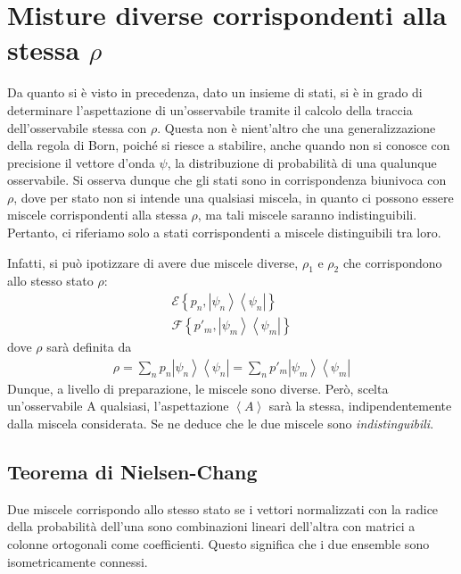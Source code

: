 \section{Misture diverse corrispondenti alla stessa $\rho$}

Da quanto si è visto in precedenza, dato un insieme di stati, si è in grado di determinare l'aspettazione di un'osservabile tramite il calcolo della traccia dell'osservabile stessa con $\rho$. Questa non è nient'altro che una generalizzazione della regola di Born, poiché si riesce a stabilire, anche quando non si conosce con precisione il vettore d'onda $\psi$, la distribuzione di probabilità di una qualunque osservabile. Si osserva dunque che gli stati sono in corrispondenza biunivoca con $\rho$, dove per stato non si intende una qualsiasi miscela, in quanto ci possono essere miscele corrispondenti alla stessa $\rho$, ma tali miscele saranno indistinguibili. Pertanto, ci riferiamo solo a stati corrispondenti a miscele distinguibili tra loro.

Infatti, si può ipotizzare di avere due miscele diverse, $\rho_1$ e $\rho_2$ che corrispondono allo stesso stato $\rho$:
\begin{equation}\begin{split}
\mathcal{E}\left\{p_n,\left|\psi _n \right\rangle\left\langle \psi _n\right |\right\} \\
\mathcal{F}\left\{p'_m,\left |\psi _m \right\rangle\left\langle \psi _m\right |\right\}
\end{split}\end{equation}
dove $\rho$ sarà definita da
\begin{equation}\begin{split}
\rho=\sum_n{p_n\left |\psi _n \right\rangle\left\langle \psi _n\right |}=\sum_n{p'_m\left |\psi _m \right\rangle\left\langle \psi _m\right |}
\end{split}\end{equation}
Dunque, a livello di preparazione, le miscele sono diverse. Però, scelta un'osservabile A qualsiasi, l'aspettazione $\left\langle A \right\rangle$ sarà la stessa, indipendentemente dalla miscela considerata. Se ne deduce che le due miscele sono \emph{indistinguibili}.

\subsection{Teorema di Nielsen-Chang} %

Due miscele corrispondo allo stesso stato se i vettori normalizzati con la radice della probabilità dell'una sono combinazioni lineari dell'altra con matrici a colonne ortogonali come coefficienti. Questo significa che i due ensemble sono isometricamente connessi.
\\

